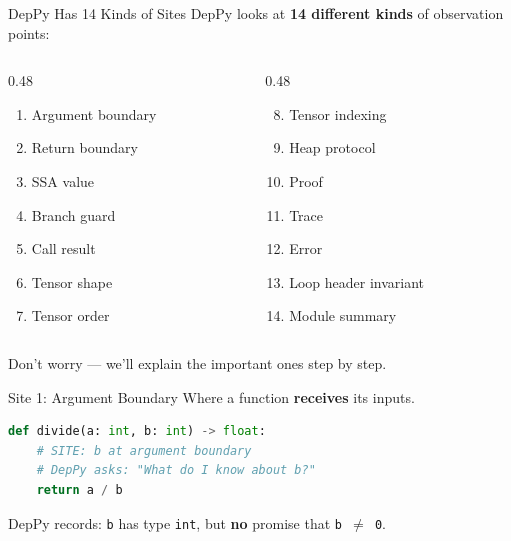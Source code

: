 \documentclass[aspectratio=169,10pt]{beamer}
\begin{document}
\begin{frame}{DepPy Has 14 Kinds of Sites}
DepPy looks at \textbf{14 different kinds} of observation points:
\vspace{0.3em}
{\small
\begin{columns}[T]
\begin{column}{0.48\textwidth}
\begin{enumerate}
  \item Argument boundary
  \item Return boundary
  \item SSA value
  \item Branch guard
  \item Call result
  \item Tensor shape
  \item Tensor order
\end{enumerate}
\end{column}
\begin{column}{0.48\textwidth}
\begin{enumerate}\setcounter{enumi}{7}
  \item Tensor indexing
  \item Heap protocol
  \item Proof
  \item Trace
  \item Error
  \item Loop header invariant
  \item Module summary
\end{enumerate}
\end{column}
\end{columns}}
\vspace{0.3em}
Don't worry --- we'll explain the important ones step by step.
\end{frame}

\begin{frame}[fragile]{Site 1: Argument Boundary}
Where a function \textbf{receives} its inputs.
\vspace{0.3em}
\begin{lstlisting}[language=Python]
def divide(a: int, b: int) -> float:
    # SITE: b at argument boundary
    # DepPy asks: "What do I know about b?"
    return a / b
\end{lstlisting}
\vspace{0.3em}
DepPy records: \texttt{b} has type \texttt{int}, but \textbf{no} promise that \texttt{b $\neq$ 0}.
\end{frame}
\end{document}
